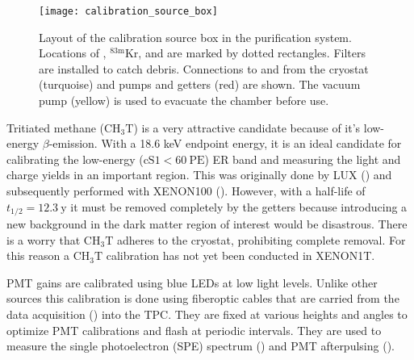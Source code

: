 \begin{figure}
\centering
\texttt{[image: calibration\_source\_box]}
\caption{Layout of the calibration source box in the purification system.  Locations of , $^{83\mathrm{m}}\mathrm{Kr}$, and
 are marked by dotted rectangles.  Filters are installed to catch debris.  Connections to and from the cryostat (turquoise)
and pumps and getters (red) are shown.  The vacuum pump (yellow) is used to evacuate the chamber before use.}
\label{fig:xenon1t_pur_cal_box_schematic}
\end{figure}

Tritiated methane ($\mathrm{C H_3 T}$) is a very attractive candidate because of it's low-energy $\beta$-emission.  With a 18.6 keV
endpoint energy, it is an ideal candidate for calibrating the low-energy ($\mathrm{cS1} < 60\ \mathrm{PE}$) ER band
and measuring
the light and charge yields in an important region.  This was originally done by LUX () and
subsequently performed with XENON100 ().  However, with a half-life of $t_{1/2} = 12.3\ \mathrm{y}$ it must be
removed completely by the getters because introducing a new background in the dark matter region of interest would be disastrous.  There
is a worry that
$\mathrm{C H_3 T}$ adheres to the cryostat, prohibiting complete removal.  For this reason a $\mathrm{C H_3 T}$ calibration has not
yet been conducted in XENON1T.

PMT gains are calibrated using blue LEDs at low light levels.  Unlike other sources this calibration is done using fiberoptic cables that
are
carried from the data acquisition () into the TPC.  They are fixed at various heights and angles to optimize
PMT calibrations and flash at periodic intervals.  They are used to measure the single photoelectron (SPE) spectrum
() and PMT afterpulsing ().

